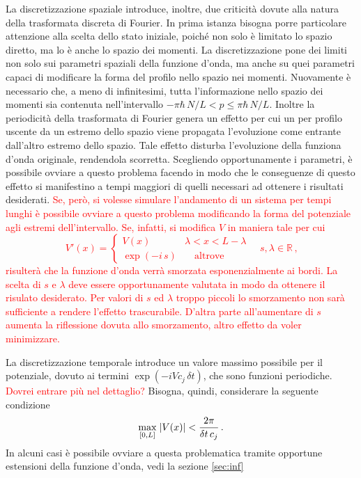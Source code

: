 La discretizzazione spaziale introduce, inoltre, due criticità dovute alla natura della trasformata discreta di Fourier. In prima istanza bisogna porre particolare attenzione alla scelta dello stato iniziale, poiché non solo è limitato lo spazio diretto, ma lo è anche lo spazio dei momenti. La discretizzazione pone dei limiti non solo sui parametri spaziali della funzione d'onda, ma anche su quei parametri capaci di modificare la forma del profilo nello spazio nei momenti. Nuovamente è necessario che, a meno di infinitesimi, tutta l'informazione nello spazio dei momenti sia contenuta nell'intervallo $ - \pi \hbar \, N / L  < p \le \pi \hbar \, N / L  $. 
Inoltre la periodicità della trasformata di Fourier genera un effetto per cui un per profilo uscente da un estremo dello spazio viene propagata l'evoluzione come entrante dall'altro estremo dello spazio. Tale effetto disturba l'evoluzione della funziona d'onda originale, rendendola scorretta. Scegliendo opportunamente i parametri, è possibile ovviare a questo problema facendo in modo che le conseguenze di questo effetto si manifestino a tempi maggiori di quelli necessari ad ottenere i risultati desiderati. 
\textcolor{red}{ Se, però, si volesse simulare l'andamento di un sistema per tempi lunghi è possibile ovviare a questo problema modificando la forma del potenziale agli estremi dell'intervallo. Se, infatti, si modifica $V$ in maniera tale per cui 
\begin{equation}
    V'(x) = 
        \begin{cases}
            V(x) \quad &\lambda < x < L - \lambda \\ 
             \exp \left(-i \, s\right) &\quad  \text{altrove}
        \end{cases}
    \quad s, \lambda \in \mathbb{R} \, \text{,}
    \label{eq:stp_bound}
\end{equation}
risulterà che la funzione d'onda verrà smorzata esponenzialmente ai bordi. La scelta di $s$ e $\lambda$ deve essere opportunamente valutata in modo da ottenere il risulato desiderato. Per valori di $s$ ed $\lambda$ troppo piccoli lo smorzamento non sarà sufficiente a rendere l'effetto trascurabile. D'altra parte all'aumentare di $s$ aumenta la riflessione dovuta allo smorzamento, altro effetto da voler minimizzare. }

La discretizzazione temporale introduce un valore massimo possibile per il potenziale, dovuto ai termini $ \exp \left(- i V c_{j} \, \delta t\right)$, che sono funzioni periodiche. \textcolor{red}{Dovrei entrare più nel dettaglio?} %
Bisogna, quindi, considerare la seguente condizione
\begin{equation}
    \underset{[0, L]}{\max} \; \abs{V(x)} < \frac{2 \pi}{\delta t \, c_{j}} \, \text{.}
    \label{eq:V_max}
\end{equation}
In alcuni casi è possibile ovviare a questa problematica tramite opportune estensioni della funzione d'onda, vedi la sezione \ref{sec:inf}


